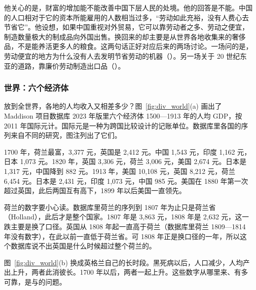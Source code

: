 他关心的是，财富的增加能不能改善中国下层人民的处境。他的回答是不能。中国的人口相对于它的资本所能雇用的人数相当过多，“劳动如此充裕，没有人费心去节省它”\cite{malthus1798}。他设想，如果中国重视对外贸易，它可以靠劳动者之多、劳动之便宜，制造数量极大的制成品向外国出售。换回来的却主要是从世界各地收集来的奢侈品，不是能养活更多人的粮食\cite{malthus1798}。这两句话正好对应后来的两场讨论。一场问的是，劳动便宜的地方为什么没有人去发明节省劳动的机器（）。另一场关于 20 世纪东亚的道路，靠廉价劳动制造出口品（）。

\subsubsection{世界：六个经济体}
放到全世界，各地的人均收入又相差多少？图~\ref{fig:div_world}(a) 画出了 Maddison 项目数据库 2023 年版里六个经济体 1500—1913 年的人均 GDP，按 2011 年国际元计\cite{mpd2023,boltvanzanden2024}。国际元是一种为跨国比较设计的记账单位。数据库里各国的序列来自不同的研究，图注列出了它们\cite{broadberry2015,vanzanden2012,smits2000,bgl2018,xu2016,bcg2015,bassino2018,fukao2015,mccusker2006,sutch2006,prados2009}。

1700 年，荷兰最富，3,377 元，英国是 2,412 元。中国 1,543 元，印度 1,162 元，日本 1,073 元。1820 年，英国 3,306 元，荷兰 3,006 元，美国 2,674 元。日本是 1,317 元，中国降到 882 元。1913 年，美国 10,108 元，英国 8,212 元，荷兰 6,454 元。日本是 2,431 元，印度 1,073 元，中国 985 元。美国在 1880 年第一次超过英国，此后两国互有高下，1899 年以后美国一直领先。

荷兰的数字要小心读。数据库里荷兰的序列到 1807 年为止只是荷兰省（Holland），此后才是整个国家。1807 年是 3,863 元，1808 年是 2,632 元，这一跌主要是换了口径。英国从 1808 年起一直高于荷兰（数据库里荷兰 1809—1814 年没有数字），在此以前一直低于荷兰省。可 1808 年正是换口径的一年，所以这个数据库说不出英国是什么时候超过整个荷兰的。

图~\ref{fig:div_world}(b) 换成英格兰自己的长时段。黑死病以后，人口减少，人均产出上升，两者此消彼长。1700 年以后，两者一起上升。这些数字从哪里来、有多可靠，是与的问题。


